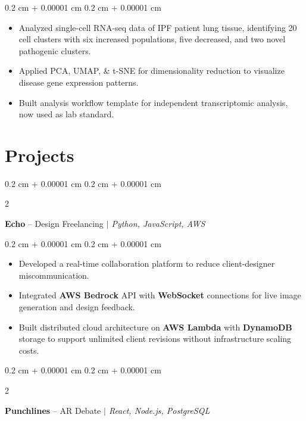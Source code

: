 \documentclass[10pt, letterpaper]{article}
\newenvironment{highlights}{
    \begin{itemize}[
        topsep=0.10 cm,
        parsep=0.10 cm,
        partopsep=0pt,
        itemsep=0pt,
        leftmargin=0.4 cm + 10pt
    ]
}{
    \end{itemize}
} %
\newenvironment{onecolentry}{
    \begin{adjustwidth}{
        0.2 cm + 0.00001 cm
    }{
        0.2 cm + 0.00001 cm
    }
}{
    \end{adjustwidth}
} %
\newenvironment{twocolentry}[2][]{
    \onecolentry
    \def\secondColumn{#2}
    \setcolumnwidth{\fill, 5 cm}
    \begin{paracol}{2}
}{
    \switchcolumn \raggedleft \secondColumn
    \end{paracol}
    \endonecolentry
} %
\let\hrefWithoutArrow\href
\renewcommand{\href}[2]{\hrefWithoutArrow{#1}{\ifthenelse{\equal{#2}{}}{ }{#2 }\raisebox{.15ex}{\footnotesize \faExternalLink*}}}
\begin{document}
        \vspace{0.10 cm}
        \begin{onecolentry}
            \begin{highlights}
                \item Analyzed single-cell RNA-seq data of IPF patient lung tissue, identifying 20 cell clusters with six increased populations, five decreased, and two novel pathogenic clusters.
                \item Applied PCA, UMAP, \& t-SNE for dimensionality reduction to visualize disease gene expression patterns.
                \item Built analysis workflow template for independent transcriptomic analysis, now used as lab standard.
            \end{highlights}
        \end{onecolentry}

    
    \section{Projects}
        
        \begin{twocolentry}{}
            \textbf{Echo} -- Design Freelancing \textit{ $|$ Python, JavaScript, AWS}
        \end{twocolentry}

        \vspace{0.10 cm}
        \begin{onecolentry}
            \begin{highlights}
                \item Developed a real-time collaboration platform to reduce client-designer miscommunication.
                \item Integrated \textbf{AWS Bedrock} API with \textbf{WebSocket} connections for live image generation and design feedback.
                \item Built distributed cloud architecture on \textbf{AWS Lambda} with \textbf{DynamoDB} storage to support unlimited client revisions without infrastructure scaling costs.
            \end{highlights}
        \end{onecolentry}


        \vspace{0.3 cm}

        \begin{twocolentry}{}
            \textbf{Punchlines} -- AR Debate \textit{ $|$ React, Node.js, PostgreSQL}
        \end{twocolentry}
\end{document}
